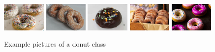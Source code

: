 \documentclass[10pt]{article}
\begin{document}
			\begin{figure}[H]
				\centering
				\includegraphics[width=0.19\textwidth]{images/data/donut/donut116.jpg}
				\includegraphics[width=0.19\textwidth]{images/data/donut/donut155.jpg}
				\includegraphics[width=0.19\textwidth]{images/data/donut/donut176.jpg}
				\includegraphics[width=0.19\textwidth]{images/data/donut/donut205.jpg}
				\includegraphics[width=0.19\textwidth]{images/data/donut/donut440.jpg}
				\caption[Example pictures of a donut class]{Example pictures of a donut class}
				\label{fig:class_donut}
			\end{figure}
\end{document}
